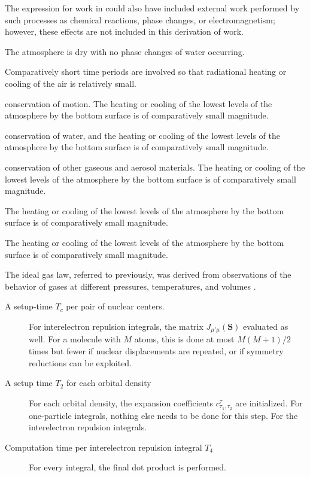 \documentclass[onecolumn,authoryear]{els-mrw}
\begin{document}
The expression for work in  could also have included external
work performed by such processes as \nobreak chemical reactions, phase changes,
or electromagnetism; however, these effects are not included in this
derivation of work.
\begin{unenumerate}%
\item The atmosphere is dry with no phase changes of water occurring.
\item Comparatively short time periods are involved so that radiational
heating or cooling of the air is relatively small.
    \begin{unenumerate}%
    \item conservation of motion. The heating or cooling of the lowest levels of the atmosphere by
    the bottom surface is of comparatively small magnitude.
    \begin{unenumerate}%
    \item conservation of water, and the heating or cooling of the lowest levels of the atmosphere by
    the bottom surface is of comparatively small magnitude.
    \item conservation of other gaseous and aerosol materials. The heating or cooling of the lowest levels of the atmosphere by
    the bottom surface is of comparatively small magnitude.
    \end{unenumerate}%
\item The heating or cooling of the lowest levels of the atmosphere by
the bottom surface is of comparatively small magnitude.
    \end{unenumerate}
\item The heating or cooling of the lowest levels of the atmosphere by
the bottom surface is of comparatively small magnitude.
\end{unenumerate}%
The ideal gas law, referred to previously, was derived from
observations of the behavior of gases at different pressures,
temperatures, and volumes \cite{bib6}.
\begin{description}
\item[A setup-time $T_c$ per pair of nuclear centers.] For interelectron repulsion
  integrals, the matrix $J_{\mu'\mu}({\mathbf{S}})$ evaluated as well.  For a
  molecule with $M$ atoms, this is done at most $M(M+1)/2$ times but
  fewer if nuclear displacements are repeated, or if symmetry
  reductions can be exploited.
\item[A setup time $T_2$ for each orbital density]  For each orbital density, the expansion
  coefficients $c_{\tau_1,\tau_2}^\tau$ are initialized. For
  one-particle integrals, nothing else needs to be done for this
  step. For the interelectron repulsion integrals.
\item[Computation time per interelectron repulsion integral $T_4$] For every integral, the final dot product is performed.
\end{description}
\end{document}
